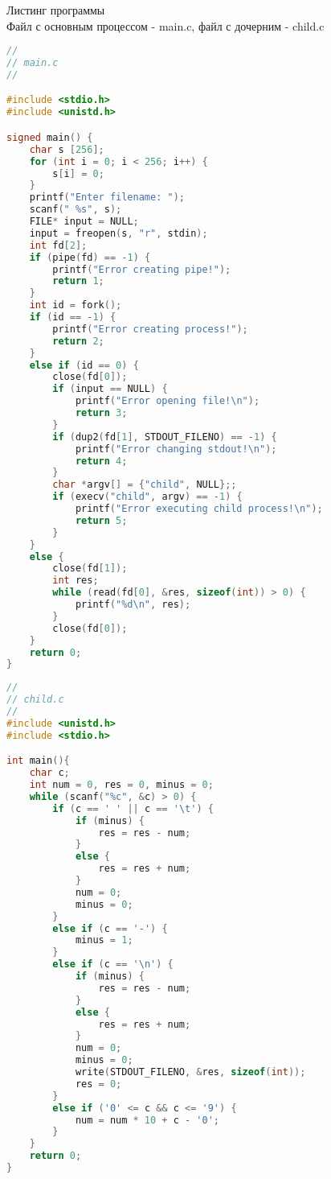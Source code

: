 Листинг программы
\\Файл с основным процессом - main.c, файл с дочерним - child.c

\begin{lstlisting}[language=C]
//
// main.c
//

#include <stdio.h>
#include <unistd.h>

signed main() {
    char s [256];
    for (int i = 0; i < 256; i++) {
        s[i] = 0;
    }
    printf("Enter filename: ");
    scanf(" %s", s);
    FILE* input = NULL;
    input = freopen(s, "r", stdin);
    int fd[2];
    if (pipe(fd) == -1) {
        printf("Error creating pipe!");
        return 1;
    }
    int id = fork();
    if (id == -1) {
        printf("Error creating process!");
        return 2;
    }
    else if (id == 0) {
        close(fd[0]);
        if (input == NULL) {
            printf("Error opening file!\n");
            return 3;
        }
        if (dup2(fd[1], STDOUT_FILENO) == -1) {
            printf("Error changing stdout!\n");
            return 4;
        }
        char *argv[] = {"child", NULL};;
        if (execv("child", argv) == -1) {
            printf("Error executing child process!\n");
            return 5;
        }
    }
    else {
        close(fd[1]);
        int res;
        while (read(fd[0], &res, sizeof(int)) > 0) {
            printf("%d\n", res);
        }
        close(fd[0]);
    }
    return 0;
}
\end{lstlisting}

\begin{lstlisting}[language=C]
//
// child.c
//
#include <unistd.h>
#include <stdio.h>

int main(){
    char c;
    int num = 0, res = 0, minus = 0;
    while (scanf("%c", &c) > 0) {
        if (c == ' ' || c == '\t') {
            if (minus) {
                res = res - num;
            }
            else {
                res = res + num;
            }
            num = 0;
            minus = 0;
        }
        else if (c == '-') {
            minus = 1;
        }
        else if (c == '\n') {
            if (minus) {
                res = res - num;
            }
            else {
                res = res + num;
            }
            num = 0;
            minus = 0;
            write(STDOUT_FILENO, &res, sizeof(int));
            res = 0;
        }
        else if ('0' <= c && c <= '9') {
            num = num * 10 + c - '0';
        }
    }
    return 0;
}


\end{lstlisting}

